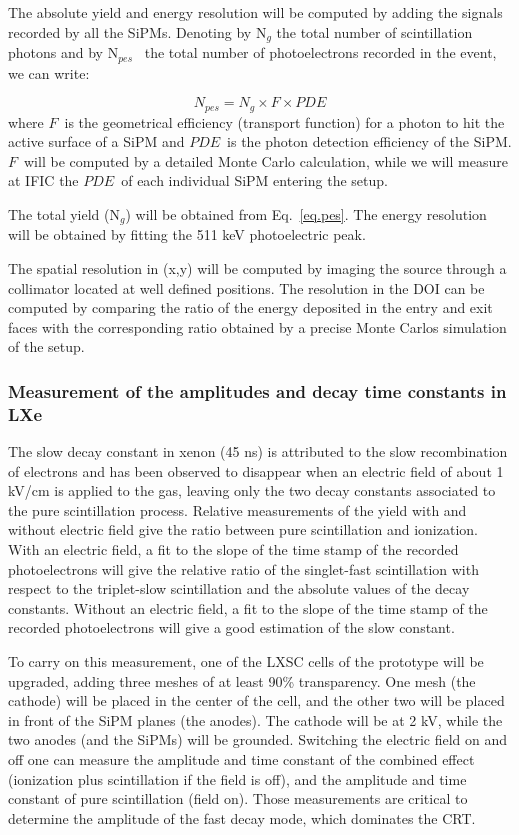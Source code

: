 The absolute yield and energy resolution will be computed by adding the signals recorded by all the SiPMs. Denoting by N$_g$ the total number of scintillation photons and by N$_{pes}$~ the total number of photoelectrons recorded in the event, we can write:

\begin{equation}
N_{pes} = N_g \times F \times PDE
\label{eq.pes}
\end{equation}
%
where $F$~is the geometrical efficiency (transport function) for a photon to hit the active surface of a SiPM and $PDE$~is the photon detection efficiency of the SiPM. $F$~will be computed by a detailed Monte Carlo calculation, while we will measure at IFIC the $PDE$~of each individual SiPM entering the setup. 

The total yield (N$_g$) will be obtained from Eq.~\ref{eq.pes}. The energy resolution will be obtained by fitting the 511 keV photoelectric peak. 

The spatial resolution in (x,y) will be computed by imaging the source through a collimator located at well defined positions. The resolution in the DOI can be computed by comparing the ratio of the energy deposited in the entry and exit faces with the corresponding ratio obtained by a precise Monte Carlos simulation of the setup. 

\subsubsection*{Measurement of the amplitudes and decay time constants in LXe}

The slow decay constant in xenon (45 ns) is attributed to the slow recombination of electrons and has been observed to disappear when an electric field of about 1 kV/cm is applied to the gas, leaving only the two decay constants associated to the pure scintillation process. Relative measurements of the yield with and without electric field give the ratio between pure scintillation and ionization. With an electric field, a fit to the slope of the time stamp of the recorded photoelectrons will give the relative ratio of the singlet-fast scintillation with respect to the triplet-slow scintillation and the absolute values of the decay constants. Without an electric field, a fit to the slope of the time stamp of the recorded photoelectrons will give a good estimation of the slow constant.

To carry on this measurement, one of the LXSC cells of the prototype will be upgraded, adding three meshes of at least 90\% transparency. One mesh (the cathode) will be placed in the center of the cell, and the other two will be placed in front of the SiPM planes (the anodes). The cathode will be at 2 kV, while the two anodes (and the SiPMs) will be grounded. Switching the electric field on and off one can measure the amplitude and time constant of the combined effect (ionization plus scintillation if the field is off), and the amplitude and time constant of pure scintillation (field on). Those measurements are critical to determine the amplitude of the fast decay mode, which dominates the CRT.  

